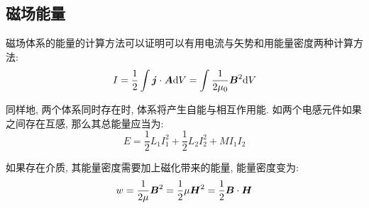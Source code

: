 \subsection{磁场能量}

磁场体系的能量的计算方法可以证明可以有用电流与矢势和用能量密度两种计算方法:
\[I=\frac{1}{2}\int \boldsymbol{j}\cdot\boldsymbol{A}\textrm{d} V=\int \frac{1}{2\mu_0}	\boldsymbol{B}^2\textrm{d} V\]

同样地, 两个体系同时存在时, 体系将产生自能与相互作用能. 如两个电感元件如果之间存在互感, 那么其总能量应当为:
\[E=\frac{1}{2}L_1I_1^2+\frac{1}{2}L_2I_2^2+ MI_1I_2\]

如果存在介质, 其能量密度需要加上磁化带来的能量, 能量密度变为:
\[w=\frac{1}{2\mu}	\boldsymbol{B}^2=\frac{1}{2}\mu \boldsymbol{H}^2 =\frac{1}{2}	\boldsymbol{B}\cdot \boldsymbol{H}\]

